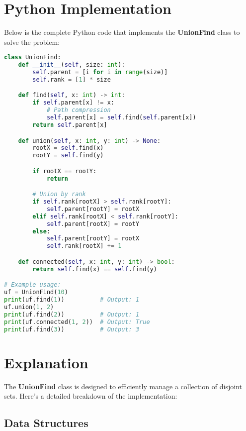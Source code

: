 \section*{Python Implementation}


Below is the complete Python code that implements the \textbf{UnionFind} class to solve the problem:

\begin{fullwidth}
\begin{lstlisting}[language=Python]
class UnionFind:
    def __init__(self, size: int):
        self.parent = [i for i in range(size)]
        self.rank = [1] * size

    def find(self, x: int) -> int:
        if self.parent[x] != x:
            # Path compression
            self.parent[x] = self.find(self.parent[x])
        return self.parent[x]

    def union(self, x: int, y: int) -> None:
        rootX = self.find(x)
        rootY = self.find(y)

        if rootX == rootY:
            return

        # Union by rank
        if self.rank[rootX] > self.rank[rootY]:
            self.parent[rootY] = rootX
        elif self.rank[rootX] < self.rank[rootY]:
            self.parent[rootX] = rootY
        else:
            self.parent[rootY] = rootX
            self.rank[rootX] += 1

    def connected(self, x: int, y: int) -> bool:
        return self.find(x) == self.find(y)

# Example usage:
uf = UnionFind(10)
print(uf.find(1))          # Output: 1
uf.union(1, 2)
print(uf.find(2))          # Output: 1
print(uf.connected(1, 2))  # Output: True
print(uf.find(3))          # Output: 3
\end{lstlisting}
\end{fullwidth}

\section*{Explanation}

The \textbf{UnionFind} class is designed to efficiently manage a collection of disjoint sets. Here's a detailed breakdown of the implementation:

\subsection*{Data Structures}

